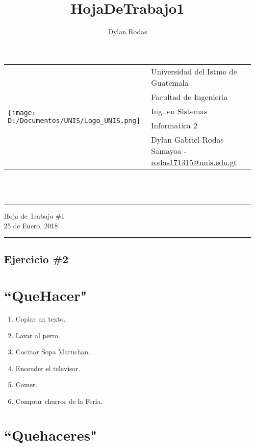 \documentclass[10pt,a4paper]{article}
\author{Dylan Rodas}
\title{HojaDeTrabajo1}
\newcommand{\horrule}[1]{\rule{\linewidth}{#1}}
\begin{document}
	\begin{tabular}{l l}
     \multirow{5}{*}{\texttt{[image: D:/Documentos/UNIS/Logo\_UNIS.png]}} & Universidad del Istmo de Guatemala \\
     & Facultad de Ingenieria \\
     & Ing. en Sistemas \\
     & Informatica 2 \\
     & Dylan Gabriel Rodas Samayoa - \href{mailto:rodas171315@unis.edu.gt}{rodas171315@unis.edu.gt} \\
    \end{tabular}
	\\\    
	
    \begin{center}
        \horrule{0.5pt}
        \huge{Hoja de Trabajo \#1} \\
        \large{25 de Enero, 2018} \\
        \horrule{1pt}
	\end{center}

	\begin{center}
	\section*{Ejercicio \#2}
	\end{center}
	
	\section*{``QueHacer"}
	
	\begin{enumerate}
            \item{Copiar un texto.}
            \item{Lavar al perro.}
            \item{Cocinar Sopa Maruchan.}
            \item{Encender el televisor.}
            \item{Comer.}
            \item{Comprar churros de la Feria.}
    \end{enumerate}
    
	\section*{``Quehaceres"}
	
\end{document}
